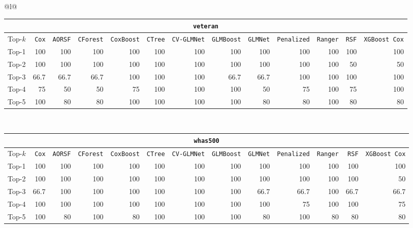 \begin{longtable}{@{}l@{}}
\begin{tabular}{@{}l*{12}{r}@{}}
\multicolumn{13}{c}{\texttt{veteran}} \\
\midrule
Top-$k$ & \texttt{Cox} & \texttt{AORSF} & \texttt{CForest} & \texttt{CoxBoost} & \texttt{CTree} & \texttt{CV-GLMNet} & \texttt{GLMBoost} & \texttt{GLMNet} & \texttt{Penalized} & \texttt{Ranger} & \texttt{RSF} & \texttt{XGBoost Cox} \\
\midrule
Top-1 & 100 & 100 & 100 & 100 & 100 & 100 & 100 & 100 & 100 & 100 & 100 & 100 \\
Top-2 & 100 & 100 & 100 & 100 & 100 & 100 & 100 & 100 & 100 & 100 & 50 & 50 \\
Top-3 & 66.7 & 66.7 & 66.7 & 100 & 100 & 100 & 66.7 & 66.7 & 100 & 100 & 100 & 100 \\
Top-4 & 75 & 50 & 50 & 75 & 100 & 100 & 100 & 50 & 75 & 100 & 75 & 100 \\
Top-5 & 100 & 80 & 80 & 100 & 100 & 100 & 100 & 80 & 80 & 100 & 80 & 80 \\
\end{tabular} \\
\midrule

\begin{tabular}{@{}l*{12}{r}@{}}
\multicolumn{13}{c}{\texttt{whas500}} \\
\midrule
Top-$k$ & \texttt{Cox} & \texttt{AORSF} & \texttt{CForest} & \texttt{CoxBoost} & \texttt{CTree} & \texttt{CV-GLMNet} & \texttt{GLMBoost} & \texttt{GLMNet} & \texttt{Penalized} & \texttt{Ranger} & \texttt{RSF} & \texttt{XGBoost Cox} \\
\midrule
Top-1 & 100 & 100 & 100 & 100 & 100 & 100 & 100 & 100 & 100 & 100 & 100 & 100 \\
Top-2 & 100 & 100 & 100 & 100 & 100 & 100 & 100 & 100 & 100 & 100 & 100 & 50 \\
Top-3 & 66.7 & 100 & 100 & 100 & 100 & 100 & 100 & 66.7 & 66.7 & 100 & 66.7 & 66.7 \\
Top-4 & 100 & 100 & 100 & 100 & 100 & 100 & 100 & 100 & 75 & 100 & 100 & 75 \\
Top-5 & 100 & 80 & 100 & 80 & 100 & 100 & 100 & 80 & 100 & 80 & 80 & 80 \\
\end{tabular} \\
\midrule


\end{longtable}
